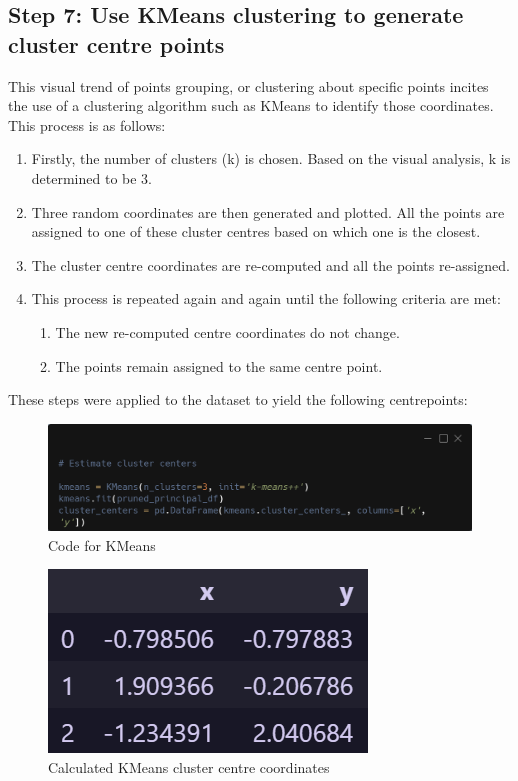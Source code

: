 \documentclass[12pt]{article}
\begin{document}
\subsection{Step 7: Use KMeans clustering to generate cluster centre points}
This visual trend of points grouping, or clustering about specific points incites the use of a clustering algorithm such as KMeans to identify those coordinates. \parencite{2} This process is as follows:
\begin{enumerate}
    \itemsep -0.5em
    \item Firstly, the number of clusters (k) is chosen. Based on the visual analysis, k is determined to be $3$.
    \item Three random coordinates are then generated and plotted. All the points are assigned to one of these cluster centres based on which one is the closest.
    \item The cluster centre coordinates are re-computed and all the points re-assigned.
    \item This process is repeated again and again until the following criteria are met:
          \begin{enumerate}
            \itemsep -0.5em
            \item The new re-computed centre coordinates do not change.
            \item The points remain assigned to the same centre point.
          \end{enumerate} 
\end{enumerate}

These steps were applied to the dataset to yield the following centrepoints:

\begin{figure}[H]
	\includegraphics[width=\textwidth]{code5}
	\centering
	\caption{Code for KMeans}
\end{figure}
\vspace{-1em}
\begin{figure}[H]
	\includegraphics[scale=0.4]{8}
	\centering
	\caption{Calculated KMeans cluster centre coordinates}
\end{figure}
\end{document}
